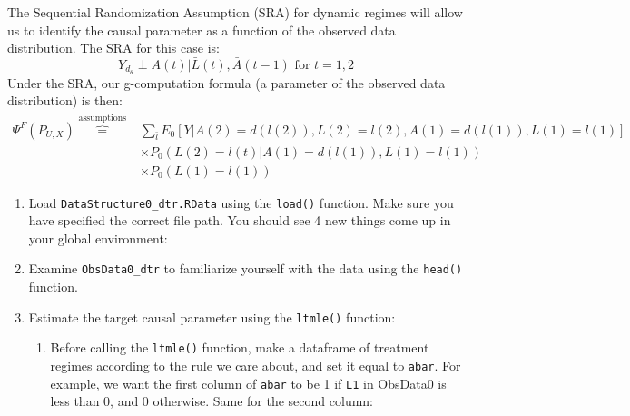 \documentclass[answers]{exam}
\newenvironment{packed_enum}{
\begin{enumerate}
 \setlength{\itemsep}{0pt}
  \setlength{\parskip}{0pt}
  \setlength{\parsep}{0pt}
}{\end{enumerate}}
\begin{document}
The Sequential Randomization Assumption (SRA) for dynamic regimes will allow us to identify the causal parameter as a function of the observed data distribution. The SRA for this case is:
\[
Y_{d_\theta} \perp A(t) | \bar{L}(t), \bar{A}(t-1) \text{ for } t = 1, 2
\]
Under the SRA, our g-computation formula (a parameter of the observed data distribution) is then:
\begin{align*}
\Psi^F(P_{U,X}) \overbrace{=}^{\text{assumptions}} & \sum_{\bar{l}} E_0[Y|A(2) = d(l(2)), L(2) = l(2), A(1) = d(l(1)), L(1) = l(1)]\\
&\times P_0(L(2) = l(t)|A(1) = d(l(1)), L(1) = l(1)) \\
& \times P_0(L(1) = l(1))
\end{align*}


\begin{enumerate}
\item Load \texttt{DataStructure0\_dtr.RData} using the \texttt{load()} function. Make sure you have specified the correct file path. You should see 4 new things come up in your global environment:
\item Examine \texttt{ObsData0\_dtr} to familiarize yourself with the data using the \texttt{head()} function.
\item Estimate the target causal parameter using the \texttt{ltmle()} function:
\begin{enumerate}
\item Before calling the \texttt{ltmle()} function, make a dataframe of treatment regimes according to the rule we care about, and set it equal to \texttt{abar}. For example, we want the first column of \texttt{abar} to be 1 if \texttt{L1} in ObsData0 is less than 0, and 0 otherwise. Same for the second column:

\end{enumerate}
\end{enumerate}
\end{document}
